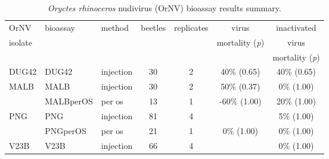 \documentclass[12pt,
letterpaper,english,bibliography=totocnumbered, abstract=on]{scrartcl}
\begin{document}
\begin{table}[h]
	\begin{adjustbox}{width=\columnwidth,center}
		
		\begin{threeparttable} 
			\caption{\textit{Oryctes rhinoceros} nudivirus (OrNV) bioassay results summary.}
			\label{tab: bioassay results}
			
			
			\begin{tabular}{ l l l c c c c }
				\toprule
				OrNV                  & bioassay                                        & method\tnote{1} & beetles & replicates & virus                           & inactivated                     \\
				isolate               &                                                 &                 &         &            & mortality (\textit{p})\tnote{2} & virus                           \\
				&                                                 &                 &         &            &                                 & mortality (\textit{p})\tnote{3} \\ \bottomrule
				DUG42                 & DUG42 \parencite{moore_bioassay_2019}                 & injection       & 30      & 2          & 40\% (0.65)                     & 40\% (0.65)                     \\ \midrule
				\multirow{2}{*}{MALB} & MALB \parencite{moore_bioassay_2019-6}                & injection       & 30      & 2          & 50\% (0.37)                     & \hphantom{0}0\% (1.00)          \\
				& MALBperOS \parencite{moore_bioassay_2019-7}           & per os          & 13      & 1          & -60\% (1.00)                    & 20\% (1.00)                     \\ \midrule
				\multirow{2}{*}{PNG}  & PNG \parencite{moore_bioassay_2019-2}                 & injection       & 81      & 4          & \cellcolor{yellow}{90\% (0.00)} & \hphantom{0}5\% (1.00)          \\
				& PNGperOS \parencite{moore_bioassay_2019-9}            & per os          & 21      & 1          & \hphantom{0}0\% (1.00)          & \hphantom{0} 0\% (1.00)         \\ \midrule
				\multirow{4}{*}{V23B} & V23B \parencite{moore_bioassay_2019-3}                & injection       & 66      & 4          & \cellcolor{yellow}{88\% (0.00)} & \hphantom{0}0\% (1.00)          \\

\end{tabular}
\end{threeparttable}
\end{adjustbox}
\end{table}
\end{document}
